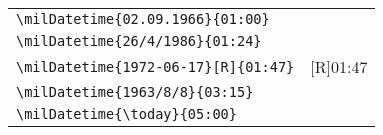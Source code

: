 \documentclass[a4paper,10pt]{scrarticle}
\begin{document}
\par\medskip
\begin{tabular}{ll}
\verb+\milDatetime{02.09.1966}{01:00}+		& \milDatetime{02.09.1966}{01:00} \\	%
\verb+\milDatetime{26/4/1986}{01:24}+		& \milDatetime{26/4/1986}{01:24} \\ 	%
\verb+\milDatetime{1972-06-17}[R]{01:47}+	& \milDatetime{1972-06-17}[R]{01:47} \\	%
\verb+\milDatetime{1963/8/8}{03:15}+		& \milDatetime{1963/8/8}{03:15} \\		%
\verb+\milDatetime{\today}{05:00}+			& \milDatetime{\today}{05:00} \\	
\end{tabular}
\end{document}
